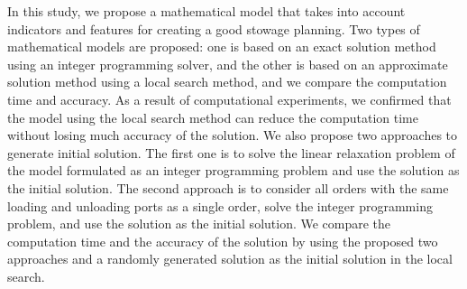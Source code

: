 In this study, we propose a mathematical model that takes into account indicators and features for creating a good stowage planning. Two types of mathematical models are proposed: one is based on an exact solution method using an integer programming solver, and the other is based on an approximate solution method using a local search method, and we compare the computation time and accuracy. As a result of computational experiments, we confirmed that the model using the local search method can reduce the computation time without losing much accuracy of the solution. We also propose two approaches to generate initial solution. The first one is to solve the linear relaxation problem of the model formulated as an integer programming problem and use the solution as the initial solution. The second approach is to consider all orders with the same loading and unloading ports as a single order, solve the integer programming problem, and use the solution as the initial solution. We compare the computation time and the accuracy of the solution by using the proposed two approaches and a randomly generated solution as the initial solution in the local search.
